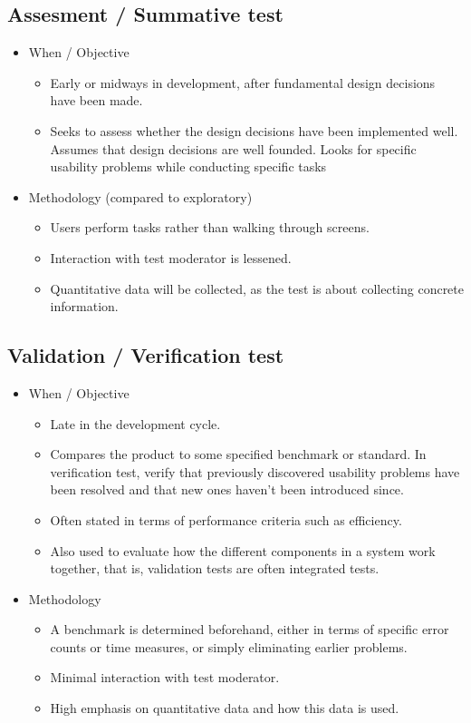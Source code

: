 \subsection{Assesment / Summative test}
\begin{itemize}
	\item When / Objective
	\begin{itemize}
		\item Early or midways in development, after fundamental design decisions have been made.
		\item Seeks to assess whether the design decisions have been implemented well. Assumes that design decisions are well founded. Looks for specific usability problems while conducting specific tasks
	\end{itemize}
	\item Methodology (compared to exploratory)
	\begin{itemize}
		\item Users perform tasks rather than walking through screens.
		\item Interaction with test moderator is lessened.
		\item Quantitative data will be collected, as the test is about collecting concrete information.
	\end{itemize}
\end{itemize}
\subsection{Validation / Verification test}
\begin{itemize}
	\item When / Objective
	\begin{itemize}
		\item Late in the development cycle.
		\item Compares the product to some specified benchmark or standard. In verification test, verify that previously discovered usability problems have been resolved and that new ones haven't been introduced since. 
		\item Often stated in terms of performance criteria such as efficiency.
		\item Also used to evaluate how the different components in a system work together, that is, validation tests are often integrated tests.
	\end{itemize}
	\item Methodology
	\begin{itemize}
		\item A benchmark is determined beforehand, either in terms of specific error counts or time measures, or simply eliminating earlier problems.
		\item Minimal interaction with test moderator.
		\item High emphasis on quantitative data and how this data is used. 
	\end{itemize}
\end{itemize}


